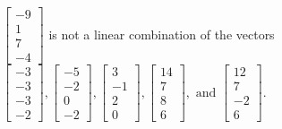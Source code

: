 \begin{exercise}
\begin{exerciseStatement}
  \end{exerciseStatement}
  \begin{exerciseAnswer}
   \(\left[\begin{array}{c}
-9 \\
1 \\
7 \\
-4
\end{array}\right]\) 
  	 is not  
	a linear combination of the vectors \(\left[\begin{array}{c}
-3 \\
-3 \\
-3 \\
-2
\end{array}\right] , \left[\begin{array}{c}
-5 \\
-2 \\
0 \\
-2
\end{array}\right] , \left[\begin{array}{c}
3 \\
-1 \\
2 \\
0
\end{array}\right] , \left[\begin{array}{c}
14 \\
7 \\
8 \\
6
\end{array}\right] , \text{ and } \left[\begin{array}{c}
12 \\
7 \\
-2 \\
6
\end{array}\right]\).

	
  


  \end{exerciseAnswer}
\end{exercise}